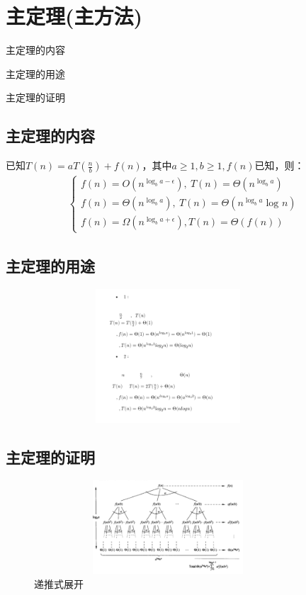 \chapter{主定理(主方法)}
\begin{introduction}
	\item 主定理的内容
	\item 主定理的用途
	\item 主定理的证明
\end{introduction}
\section{主定理的内容}
已知$T(n) = a T(\frac{n}{b}) + f(n)$，其中$a\geq 1, b\geq 1, f(n)$已知，则：
$$
\begin{array}{l}  
  \left\{\begin{matrix} 
  f(n) = O(n^{\log_{b}{a} - \epsilon} ),~T(n) = \Theta(n^{\log_{b}{a}} )  \\ 
  f(n) =  \Theta(n^{\log_{b}{a}} ),~T(n) = \Theta(n^{\log_{b}{a}}\log_{}{n} ) \\ 
  f(n) = \Omega (n^{\log_{b}{a} + \epsilon} ),T(n) = \Theta (f(n))
\end{matrix}\right.    
\end{array} 
$$
\section{主定理的用途}
        \begin{figure}[h]
	\begin{minipage}[t]{1\linewidth}
		\centering
		\includegraphics[width=10cm,height=5cm]{image/main1.png}
	\end{minipage}
\end{figure}
\section{主定理的证明}
\begin{figure}[h]
	\begin{minipage}[t]{1\linewidth}
		\centering
		\includegraphics[width=10cm,height=3.5cm]{image/mainmaster.png}
		\caption{递推式展开}
	\end{minipage}
\end{figure}
